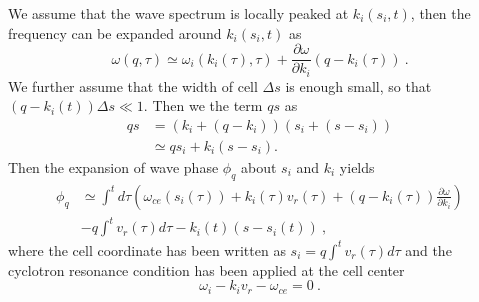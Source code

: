 We assume that the wave spectrum is locally peaked at $k_i(s_i,t)$,
then the frequency can be expanded around  $k_i(s_i,t)$ as 
\begin{equation}
    \omega(q,\tau) \simeq \omega_{i}\left(k_{i}(\tau), \tau\right) + \frac{\partial \omega}{\partial k_{i}}\left(q-k_{i}(\tau)\right)~.
\end{equation}
We further assume that the width of cell $\Delta s$ is enough small, so that 
$\left(q-k_i(t)\right) \Delta s \ll 1$. Then 
we 
the term $q s$ as 
\begin{equation}
    \begin{aligned}
        q s & = (k_i + (q-k_i)) (s_i+(s-s_i))           \\
            & \simeq  q s_i + k_i (s-s_i).                
    \end{aligned}
\end{equation}
Then the expansion of wave phase $\phi_q$ about $s_i$ and $k_i$ yields
\begin{equation}
\begin{aligned}
    \phi_{q} 
    & \simeq  \int^{t}  d \tau \left( \omega_{c e}\left(s_{i}(\tau)\right)+ k_i(\tau) v_r(\tau)  + \left(q-k_{i}(\tau)\right)\frac{\partial \omega}{\partial k_{i}} \right) 
        \\ 
        &- q \int^t v_r(\tau) d \tau - k_{i}(t)\left(s-s_{i}(t)\right)~,
\end{aligned}
\end{equation}
where 
the cell coordinate has been written as $s_i= q \int^t v_r(\tau) d \tau$
and
the  cyclotron resonance condition has been applied at the cell center
\begin{equation}
    \omega_i - k_i v_r - \omega_{ce} = 0~.
\end{equation}
